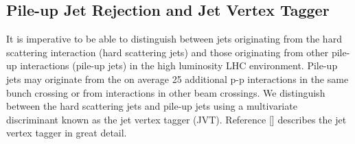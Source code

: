 \subsection{Pile-up Jet Rejection and Jet Vertex Tagger}
\label{sec:jet:JVT}

\indent It is imperative to be able to distinguish between jets originating from the hard scattering interaction (hard scattering jets) and those originating from other pile-up interactions (pile-up jets) in the high luminosity LHC environment.  Pile-up jets may originate from the on average 25 additional p-p interactions in the same bunch crossing or from interactions in other beam crossings.  We distinguish between the hard scattering jets and pile-up jets using a multivariate discriminant known as the jet vertex tagger (JVT).  Reference [\cite{JVT}] describes the jet vertex tagger in great detail. \\






